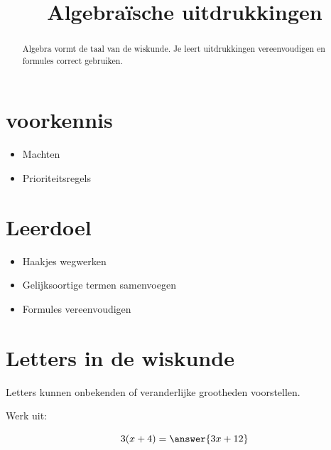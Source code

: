 \documentclass{ximera}
\title{Algebraïsche uitdrukkingen}
\begin{document}
\begin{abstract}
Algebra vormt de taal van de wiskunde. Je leert uitdrukkingen vereenvoudigen en formules correct gebruiken.
\end{abstract}

\maketitle

\section{voorkennis}
\begin{itemize}
\item Machten
\item Prioriteitsregels
\end{itemize}


\section{Leerdoel}
\begin{itemize}
\item Haakjes wegwerken
\item Gelijksoortige termen samenvoegen
\item Formules vereenvoudigen
\end{itemize}


\section{Letters in de wiskunde}

Letters kunnen onbekenden of veranderlijke grootheden voorstellen.

\begin{exercise}

Werk uit:

\[
3(x+4)=\answer{3x+12}
\]

\end{exercise}
\end{document}
